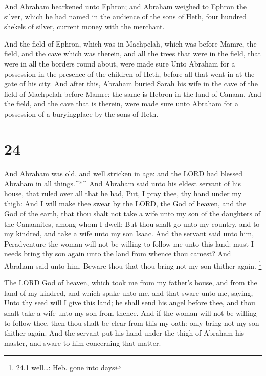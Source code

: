  And Abraham hearkened unto Ephron; and Abraham weighed to
Ephron the silver, which he had named in the audience of the sons of
Heth, four hundred shekels of silver, current money with the merchant.

 And the field of Ephron, which was in Machpelah, which was
before Mamre, the field, and the cave which was therein, and all the
trees that were in the field, that were in all the borders round about,
were made sure  Unto Abraham for a possession in the
presence of the children of Heth, before all that went in at the gate of
his city.  And after this, Abraham buried Sarah his wife in
the cave of the field of Machpelah before Mamre: the same is Hebron in
the land of Canaan.  And the field, and the cave that is
therein, were made sure unto Abraham for a possession of a buryingplace
by the sons of Heth.

\hypertarget{section-23}{%
\section{24}\label{section-23}}

 And Abraham was old, and well stricken in age: and the LORD
had blessed Abraham in all things.\^{}*\^{}  And Abraham
said unto his eldest servant of his house, that ruled over all that he
had, Put, I pray thee, thy hand under my thigh:  And I will
make thee swear by the LORD, the God of heaven, and the God of the
earth, that thou shalt not take a wife unto my son of the daughters of
the Canaanites, among whom I dwell:  But thou shalt go unto
my country, and to my kindred, and take a wife unto my son Isaac.
 And the servant said unto him, Peradventure the woman will
not be willing to follow me unto this land: must I needs bring thy son
again unto the land from whence thou camest?  And Abraham
said unto him, Beware thou that thou bring not my son thither again.
\footnote{24.1 well\ldots: Heb. gone into days}

 The LORD God of heaven, which took me from my father's
house, and from the land of my kindred, and which spake unto me, and
that sware unto me, saying, Unto thy seed will I give this land; he
shall send his angel before thee, and thou shalt take a wife unto my son
from thence.  And if the woman will not be willing to follow
thee, then thou shalt be clear from this my oath: only bring not my son
thither again.  And the servant put his hand under the thigh
of Abraham his master, and sware to him concerning that matter.

